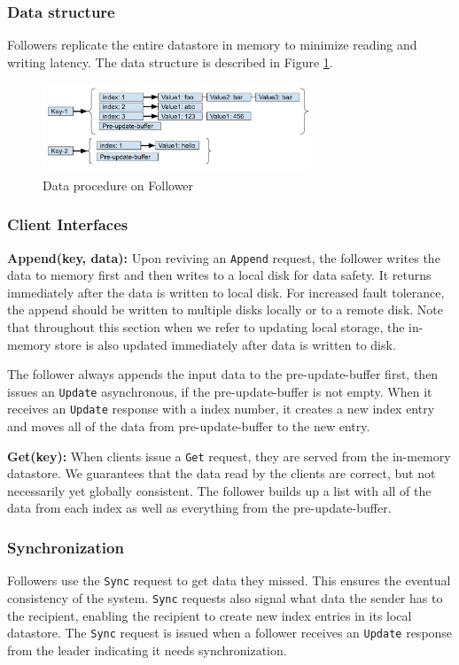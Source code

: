 \documentclass[11pt,english,twocolumn]{article}
\begin{document}
\subsubsection{Data structure}
Followers replicate the entire datastore in memory to minimize
reading and writing latency. The data structure is described in Figure \ref{DataStructure}.

\begin{figure}[h]
\includegraphics[width=8cm]{figure/DataStructure.pdf}
\caption{Data procedure on Follower}
\label{DataStructure}
\end{figure}

\subsubsection{Client Interfaces}
\textbf{Append(key, data):} Upon reviving an \texttt{Append} request, the
follower writes the data to memory first and then writes to a local disk for data
safety. It returns immediately after the data is written to local disk. For
increased fault tolerance, the append should be written to multiple disks
locally or to a remote disk. Note that throughout this section when we
refer to updating local storage, the in-memory store is also updated immediately
after data is written to disk.

The follower always appends the input data to the pre-update-buffer first, then issues an
\texttt{Update} asynchronous, if the pre-update-buffer is not empty. When it receives an
\texttt{Update} response with a index number, it creates a new index entry and
moves all of the data from pre-update-buffer to the new entry. 

\noindent \textbf{Get(key):} When clients issue a \texttt{Get} request, they are
served from the in-memory datastore. We guarantees that the data read by the
clients are correct, but not necessarily yet globally consistent. The follower
builds up a list with all of the data from each index as well as everything from
the pre-update-buffer.

\subsubsection{Synchronization}
Followers use the \texttt{Sync} request to get data they missed. This ensures
the eventual consistency of the system. \texttt{Sync} requests also signal what
data the sender has to the recipient, enabling the recipient to create new index
entries in its local datastore. The \texttt{Sync} request is issued when a
follower receives an \texttt{Update} response from the leader indicating it
needs synchronization. 
\end{document}
